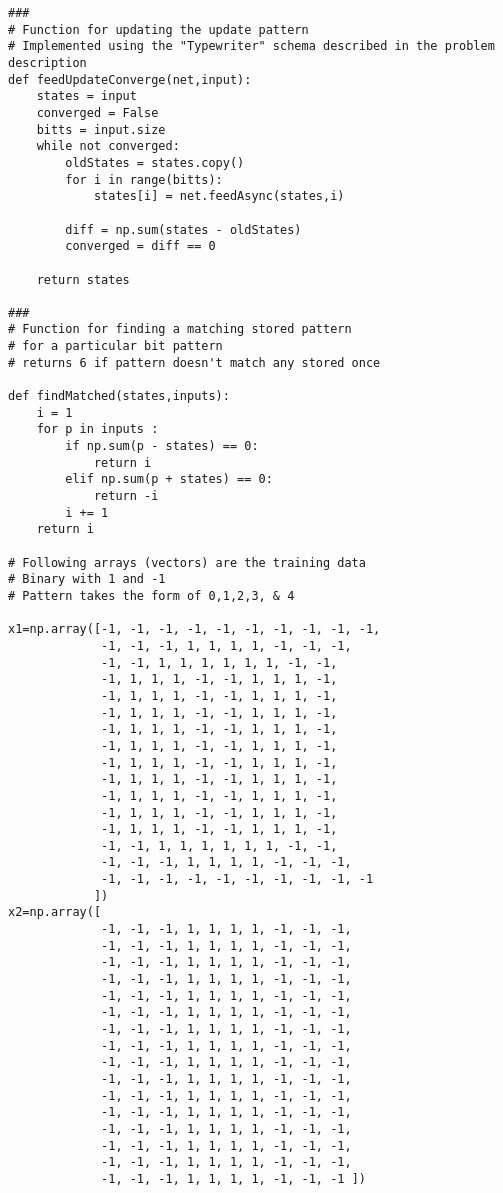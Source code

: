 \documentclass{article}
\begin{document}
\begin{verbatim}
###
# Function for updating the update pattern
# Implemented using the "Typewriter" schema described in the problem description
def feedUpdateConverge(net,input):
    states = input
    converged = False
    bitts = input.size
    while not converged:
        oldStates = states.copy()
        for i in range(bitts):
            states[i] = net.feedAsync(states,i)
        
        diff = np.sum(states - oldStates)
        converged = diff == 0
    
    return states

###
# Function for finding a matching stored pattern 
# for a particular bit pattern
# returns 6 if pattern doesn't match any stored once

def findMatched(states,inputs):
    i = 1
    for p in inputs :
        if np.sum(p - states) == 0:
            return i
        elif np.sum(p + states) == 0:
            return -i
        i += 1
    return i 
        
# Following arrays (vectors) are the training data
# Binary with 1 and -1
# Pattern takes the form of 0,1,2,3, & 4

x1=np.array([-1, -1, -1, -1, -1, -1, -1, -1, -1, -1,
             -1, -1, -1, 1, 1, 1, 1, -1, -1, -1,
             -1, -1, 1, 1, 1, 1, 1, 1, -1, -1,
             -1, 1, 1, 1, -1, -1, 1, 1, 1, -1,
             -1, 1, 1, 1, -1, -1, 1, 1, 1, -1,
             -1, 1, 1, 1, -1, -1, 1, 1, 1, -1,
             -1, 1, 1, 1, -1, -1, 1, 1, 1, -1,
             -1, 1, 1, 1, -1, -1, 1, 1, 1, -1,
             -1, 1, 1, 1, -1, -1, 1, 1, 1, -1,
             -1, 1, 1, 1, -1, -1, 1, 1, 1, -1,
             -1, 1, 1, 1, -1, -1, 1, 1, 1, -1,
             -1, 1, 1, 1, -1, -1, 1, 1, 1, -1,
             -1, 1, 1, 1, -1, -1, 1, 1, 1, -1,
             -1, -1, 1, 1, 1, 1, 1, 1, -1, -1,
             -1, -1, -1, 1, 1, 1, 1, -1, -1, -1,
             -1, -1, -1, -1, -1, -1, -1, -1, -1, -1
            ])
x2=np.array([
             -1, -1, -1, 1, 1, 1, 1, -1, -1, -1,
             -1, -1, -1, 1, 1, 1, 1, -1, -1, -1,
             -1, -1, -1, 1, 1, 1, 1, -1, -1, -1,
             -1, -1, -1, 1, 1, 1, 1, -1, -1, -1,
             -1, -1, -1, 1, 1, 1, 1, -1, -1, -1,
             -1, -1, -1, 1, 1, 1, 1, -1, -1, -1,
             -1, -1, -1, 1, 1, 1, 1, -1, -1, -1,
             -1, -1, -1, 1, 1, 1, 1, -1, -1, -1,
             -1, -1, -1, 1, 1, 1, 1, -1, -1, -1,
             -1, -1, -1, 1, 1, 1, 1, -1, -1, -1,
             -1, -1, -1, 1, 1, 1, 1, -1, -1, -1,
             -1, -1, -1, 1, 1, 1, 1, -1, -1, -1,
             -1, -1, -1, 1, 1, 1, 1, -1, -1, -1,
             -1, -1, -1, 1, 1, 1, 1, -1, -1, -1,
             -1, -1, -1, 1, 1, 1, 1, -1, -1, -1,
             -1, -1, -1, 1, 1, 1, 1, -1, -1, -1 ])


\end{verbatim}
\end{document}
